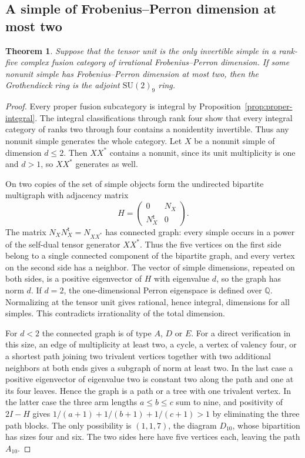 \documentclass[11pt,a4paper]{article}
\newtheorem{theorem}{Theorem}[section]
\numberwithin{equation}{section}
\begin{document}
\subsection{A simple of Frobenius--Perron dimension at most two}
\begin{theorem}\label{thm:perfect-small-simple}
Suppose that the tensor unit is the only invertible simple in a rank-five complex fusion category of irrational Frobenius--Perron dimension. If some nonunit simple has Frobenius--Perron dimension at most two, then the Grothendieck ring is the adjoint $\mathrm{SU}(2)_9$ ring.
\end{theorem}
\begin{proof}
Every proper fusion subcategory is integral by Proposition~\ref{prop:proper-integral}. The integral classifications through rank four \cite{ABDP} show that every integral category of ranks two through four contains a nonidentity invertible. Thus any nonunit simple generates the whole category. Let $X$ be a nonunit simple of dimension $d\le2$. Then $X X^*$ contains a nonunit, since its unit multiplicity is one and $d>1$, so $X X^*$ generates as well.

On two copies of the set of simple objects form the undirected bipartite multigraph with adjacency matrix
\[
 H=\begin{pmatrix}0&N_X\\N_X^{\mathsf t}&0\end{pmatrix}.
\]
The matrix $N_X N_X^{\mathsf t}=N_{XX^*}$ has connected graph: every simple occurs in a power of the self-dual tensor generator $XX^*$. Thus the five vertices on the first side belong to a single connected component of the bipartite graph, and every vertex on the second side has a neighbor. The vector of simple dimensions, repeated on both sides, is a positive eigenvector of $H$ with eigenvalue $d$, so the graph has norm $d$. If $d=2$, the one-dimensional Perron eigenspace is defined over $\mathbb Q$. Normalizing at the tensor unit gives rational, hence integral, dimensions for all simples. This contradicts irrationality of the total dimension.

For $d<2$ the connected graph is of type $A$, $D$ or $E$. For a direct verification in this size, an edge of multiplicity at least two, a cycle, a vertex of valency four, or a shortest path joining two trivalent vertices together with two additional neighbors at both ends gives a subgraph of norm at least two. In the last case a positive eigenvector of eigenvalue two is constant two along the path and one at its four leaves. Hence the graph is a path or a tree with one trivalent vertex. In the latter case the three arm lengths $a\le b\le c$ sum to nine, and positivity of $2I-H$ gives $1/(a+1)+1/(b+1)+1/(c+1)>1$ by eliminating the three path blocks. The only possibility is $(1,1,7)$, the diagram $D_{10}$, whose bipartition has sizes four and six. The two sides here have five vertices each, leaving the path $A_{10}$.


\end{proof}
\end{document}
